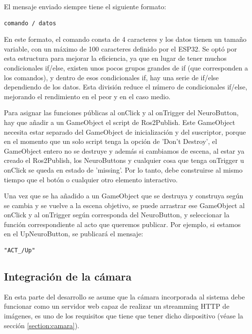 El mensaje enviado siempre tiene el siguiente formato:

\begin{verbatim}
comando / datos
\end{verbatim}

En este formato, el comando consta de 4 caracteres y los datos tienen un tamaño variable, con un máximo de 100 caracteres definido por el ESP32. Se optó por esta estructura para mejorar la eficiencia, ya que en lugar de tener muchos condicionales if/else, existen unos pocos grupos grandes de if (que corresponden a los comandos), y dentro de esos condicionales if, hay una serie de if/else dependiendo de los datos. Esta división reduce el número de condicionales if/else, mejorando el rendimiento en el peor y en el caso medio.



Para asignar las funciones públicas al onClick y al onTrigger del NeuroButton, hay que añadir a un GameObject el script de Ros2Publish. Este GameObject necesita estar separado del GameObject de inicialización y del suscriptor, porque en el momento que un solo script tenga la opción de 'Don't Destroy', el GameObject entero no se destruye y además si cambiamos de escena, al estar ya creado el Ros2Publish, los NeuroButtons y cualquier cosa que tenga onTrigger u onClick se queda en estado de 'missing'. Por lo tanto, debe construirse al mismo tiempo que el botón o cualquier otro elemento interactivo.



Una vez que se ha añadido a un GameObject que se destruya y construya según se cambia y se vuelve a la escena objetivo, se puede arrastrar ese GameObject al onClick y al onTrigger según corresponda del NeuroButton, y seleccionar la función correspondiente al acto que queremos publicar. Por ejemplo, si estamos en el UpNeuroButton, se publicará el mensaje: %

\begin{verbatim}
"ACT_/Up"
\end{verbatim}


\subsection{Integraci\'on de la cámara}

En esta parte del desarrollo se asume que la c\'amara incorporada al sistema debe funcionar como un servidor web  capaz de realizar un streamming HTTP de im\'agenes, es uno de los requisitos que tiene que tener dicho dispositivo (véase la sección \ref{section:camara}).

